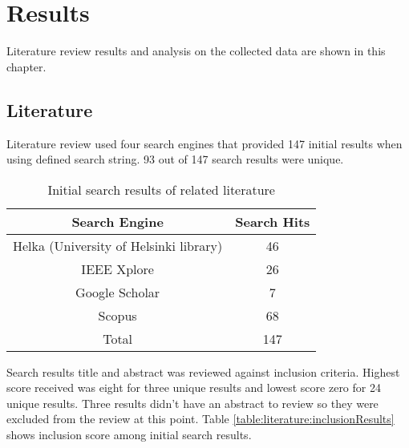 \chapter{Results\label{results}}
Literature review results and analysis on the collected data are shown in this chapter.

\section{Literature}
Literature review used four search engines that provided 147 initial results when using defined search string.
93 out of 147 search results were unique.
\begin{table}[ht!]
    \begin{tabular}{|c c|} 
        \hline
        Search Engine
        & Search Hits
        \\ 
        \hline\hline
        Helka (University of Helsinki library)
        & 46
        \\ 
        \hline
        IEEE Xplore
        & 26
        \\ 
        \hline
        Google Scholar
        & 7
        \\ 
        \hline
        Scopus
        & 68
        \\ 
        \hline
        Total
        & 147
        \\ 
        \hline
    \end{tabular}    
    \caption{Initial search results of related literature}
    \label{table:literature:initialSearchResults}
\end{table}
Search results title and abstract was reviewed against inclusion criteria.
Highest score received was eight for three unique results and lowest score zero for 24 unique results.
Three results didn't have an abstract to review so they were excluded from the review at this point.
Table \ref{table:literature:inclusionResults} shows inclusion score among initial search results.
